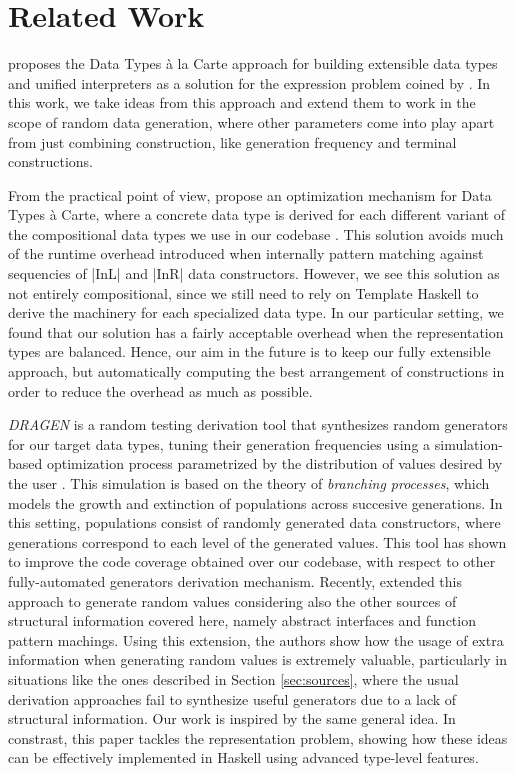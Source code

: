 \section{Related Work}
\label{sec:related}

\citeauthor{SwierstraDTC} \cite{SwierstraDTC} proposes the Data Types \`a la
Carte approach for building extensible data types and unified interpreters as a
solution for the expression problem coined by \citeauthor{wadler1998expression}
\cite{wadler1998expression}.
%
In this work, we take ideas from this approach and extend them to work in the
scope of random data generation, where other parameters come into play apart
from just combining construction, like generation frequency and terminal
constructions.


From the practical point of view, \citeauthor{KiriyamaOptimizingDTC} propose an
optimization mechanism for Data Types \`a Carte, where a concrete data type is
derived for each different variant of the compositional data types we use in our
codebase \cite{KiriyamaOptimizingDTC}.
%
This solution avoids much of the runtime overhead introduced when internally
pattern matching against sequencies of |InL| and |InR| data constructors.
%
However, we see this solution as not entirely compositional, since we still need
to rely on Template Haskell to derive the machinery for each specialized data
type.
%
In our particular setting, we found that our solution has a fairly acceptable
overhead when the representation types are balanced.
%
Hence, our aim in the future is to keep our fully extensible approach, but
automatically computing the best arrangement of constructions in order to reduce
the overhead as much as possible.


\emph{DRAGEN} is a random testing derivation tool that synthesizes random
generators for our target data types, tuning their generation frequencies using
a simulation-based optimization process parametrized by the distribution of
values desired by the user \cite{DBLP:conf/haskell/MistaRH18}.
%
This simulation is based on the theory of \emph{branching processes}, which
models the growth and extinction of populations across succesive generations.
%
In this setting, populations consist of randomly generated data constructors,
where generations correspond to each level of the generated values.
%
This tool has shown to improve the code coverage obtained over our codebase,
with respect to other fully-automated generators derivation mechanism.
%
Recently, \citeauthor{Mista2019GeneratingRS} extended this approach to generate
random values considering also the other sources of structural information
covered here, namely abstract interfaces and function pattern machings.
%
Using this extension, the authors show how the usage of extra information when
generating random values is extremely valuable, particularly in situations like
the ones described in Section \ref{sec:sources}, where the usual derivation
approaches fail to synthesize useful generators due to a lack of structural
information.
%
Our work is inspired by the same general idea. In constrast, this paper tackles
the representation problem, showing how these ideas can be effectively
implemented in Haskell using advanced type-level features.
